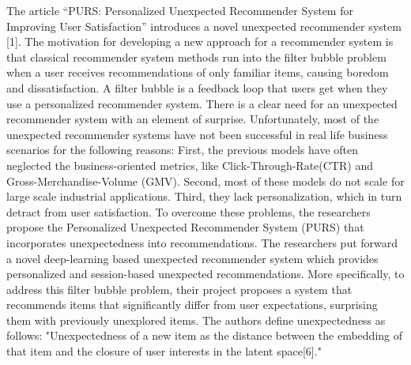 The article “PURS: Personalized Unexpected Recommender System for Improving User Satisfaction” introduces a novel unexpected recommender system [1]. The motivation for developing a new approach for a recommender system is that classical recommender system methods run into the filter bubble problem when a user receives recommendations of only familiar items, causing boredom and dissatisfaction. A filter bubble is a feedback loop that users get when they use a personalized recommender system. There is a clear need for an unexpected recommender system with an element of surprise.
Unfortunately, most of the unexpected recommender systems have not been successful in real life business scenarios for the following reasons: First, the previous models have often neglected the business-oriented metrics, like  Click-Through-Rate(CTR) and Gross-Merchandise-Volume (GMV). Second, most of these models do not scale for large scale industrial applications. Third, they lack personalization, which in turn detract from user satisfaction. To overcome these problems, the researchers propose the Personalized Unexpected Recommender System (PURS) that incorporates unexpectedness into recommendations. The researchers put forward a novel deep-learning based unexpected recommender system which provides personalized and session-based unexpected recommendations. More specifically, to address this filter bubble problem, their project proposes a system that recommends items that significantly differ from user expectations, surprising them with previously unexplored items. The authors define unexpectedness as follows: "Unexpectedness of a new item as the distance between the embedding of that item and the closure of user interests in the latent space[6]." 
	
